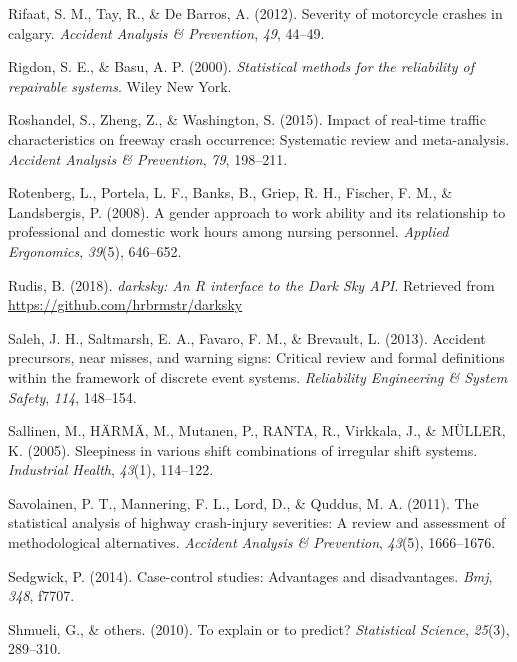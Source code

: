 \documentclass[12pt]{book}
\numberwithin{equation}{chapter}
\begin{document}
\leavevmode\hypertarget{ref-rifaat2012severity}{}%
Rifaat, S. M., Tay, R., \& De Barros, A. (2012). Severity of motorcycle crashes in calgary. \emph{Accident Analysis \& Prevention}, \emph{49}, 44--49.

\leavevmode\hypertarget{ref-rigdon2000statistical}{}%
Rigdon, S. E., \& Basu, A. P. (2000). \emph{Statistical methods for the reliability of repairable systems}. Wiley New York.

\leavevmode\hypertarget{ref-roshandel2015impact}{}%
Roshandel, S., Zheng, Z., \& Washington, S. (2015). Impact of real-time traffic characteristics on freeway crash occurrence: Systematic review and meta-analysis. \emph{Accident Analysis \& Prevention}, \emph{79}, 198--211.

\leavevmode\hypertarget{ref-rotenberg2008gender}{}%
Rotenberg, L., Portela, L. F., Banks, B., Griep, R. H., Fischer, F. M., \& Landsbergis, P. (2008). A gender approach to work ability and its relationship to professional and domestic work hours among nursing personnel. \emph{Applied Ergonomics}, \emph{39}(5), 646--652.

\leavevmode\hypertarget{ref-hrbrmstr}{}%
Rudis, B. (2018). \emph{darksky: An R interface to the Dark Sky API}. Retrieved from \url{https://github.com/hrbrmstr/darksky}

\leavevmode\hypertarget{ref-saleh2013accident}{}%
Saleh, J. H., Saltmarsh, E. A., Favaro, F. M., \& Brevault, L. (2013). Accident precursors, near misses, and warning signs: Critical review and formal definitions within the framework of discrete event systems. \emph{Reliability Engineering \& System Safety}, \emph{114}, 148--154.

\leavevmode\hypertarget{ref-sallinen2005sleepiness}{}%
Sallinen, M., HÄRMÄ, M., Mutanen, P., RANTA, R., Virkkala, J., \& MÜLLER, K. (2005). Sleepiness in various shift combinations of irregular shift systems. \emph{Industrial Health}, \emph{43}(1), 114--122.

\leavevmode\hypertarget{ref-savolainen2011statistical}{}%
Savolainen, P. T., Mannering, F. L., Lord, D., \& Quddus, M. A. (2011). The statistical analysis of highway crash-injury severities: A review and assessment of methodological alternatives. \emph{Accident Analysis \& Prevention}, \emph{43}(5), 1666--1676.

\leavevmode\hypertarget{ref-sedgwick2014case}{}%
Sedgwick, P. (2014). Case-control studies: Advantages and disadvantages. \emph{Bmj}, \emph{348}, f7707.

\leavevmode\hypertarget{ref-shmueli2010explain}{}%
Shmueli, G., \& others. (2010). To explain or to predict? \emph{Statistical Science}, \emph{25}(3), 289--310.
\end{document}
